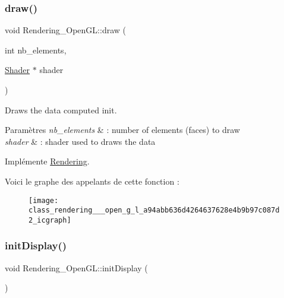 \subsubsection{\texorpdfstring{draw()}{draw()}}
{\footnotesize\ttfamily void Rendering\+\_\+\+Open\+G\+L\+::draw (\begin{DoxyParamCaption}\item[{int}]{nb\+\_\+elements,  }\item[{\hyperlink{class_shader}{Shader} $\ast$}]{shader }\end{DoxyParamCaption})\hspace{0.3cm}{\ttfamily [virtual]}}



Draws the data computed init. 


\begin{DoxyParams}{Paramètres}
{\em nb\+\_\+elements} & \+: number of elements (faces) to draw \\
\hline
{\em shader} & \+: shader used to draws the data \\
\hline
\end{DoxyParams}


Implémente \hyperlink{class_rendering_abeffb3c261cd9b5c6b885aaf8e321ef2}{Rendering}.

Voici le graphe des appelants de cette fonction \+:\nopagebreak
\begin{figure}[H]
\begin{center}
\leavevmode
\texttt{[image: class\_rendering\_\_\_open\_g\_l\_a94abb636d4264637628e4b9b97c087d2\_icgraph]}
\end{center}
\end{figure}
\mbox{\label{class_rendering___open_g_l_a2df315de627ccedc056c5834e65bda6d}} 
\subsubsection{\texorpdfstring{init\+Display()}{initDisplay()}}
{\footnotesize\ttfamily void Rendering\+\_\+\+Open\+G\+L\+::init\+Display (\begin{DoxyParamCaption}{ }\end{DoxyParamCaption})\hspace{0.3cm}{\ttfamily [virtual]}}



